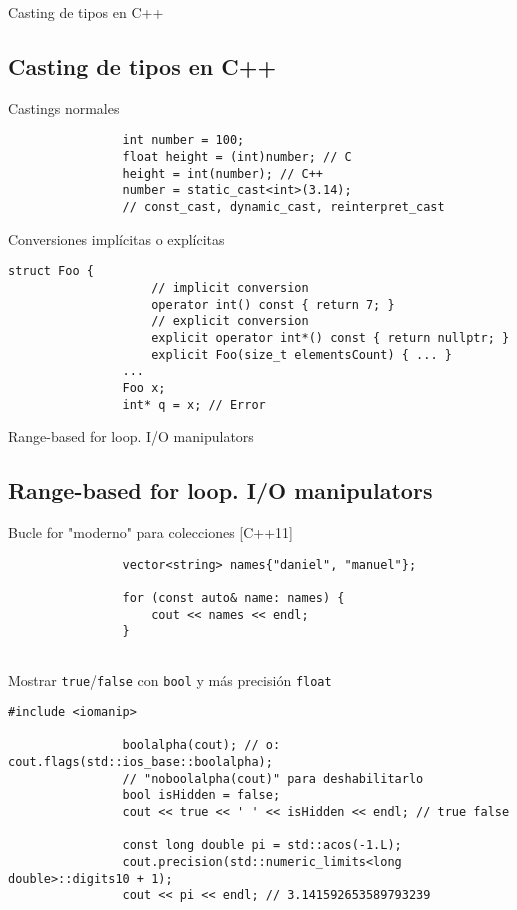 \documentclass{beamer}
\newcommand{\normalSizeItem}[1] {
  \normalsize{\item #1}
}
\begin{document}
		\begin{frame}[fragile]{Casting de tipos en C++}	
			\subsection{Casting de tipos en C++}		
			\begin{itemize}
			
				\normalSizeItem { Castings normales }
				\begin{lstlisting}
				int number = 100;
				float height = (int)number; // C
				height = int(number); // C++
				number = static_cast<int>(3.14);
				// const_cast, dynamic_cast, reinterpret_cast
				\end{lstlisting}
				
				\normalSizeItem { Conversiones implícitas o explícitas }
				\begin{lstlisting}[basicstyle={\tiny\ttfamily}]
				struct Foo {
					// implicit conversion
					operator int() const { return 7; } 
					// explicit conversion
					explicit operator int*() const { return nullptr; }   
					explicit Foo(size_t elementsCount) { ... }
				...
				Foo x;
				int* q = x; // Error
				\end{lstlisting}
				
			\end{itemize}
		\end{frame}
		
		\begin{frame}[fragile]{Range-based for loop. I/O manipulators}	
			\subsection{Range-based for loop. I/O manipulators}		
			\begin{itemize}
			
				\normalSizeItem { Bucle for "moderno" para colecciones [C++11] }
				\begin{lstlisting}
				vector<string> names{"daniel", "manuel"};
				
				for (const auto& name: names) {
					cout << names << endl;
				}
				
				\end{lstlisting}
				
				\normalSizeItem { Mostrar \texttt{true}/\texttt{false} con \texttt{bool} y más precisión \texttt{float} }
				\begin{lstlisting}[basicstyle={\tiny\ttfamily}]
				#include <iomanip>
				
				boolalpha(cout); // o: cout.flags(std::ios_base::boolalpha);
				// "noboolalpha(cout)" para deshabilitarlo
				bool isHidden = false;
				cout << true << ' ' << isHidden << endl; // true false
				
				const long double pi = std::acos(-1.L);
				cout.precision(std::numeric_limits<long double>::digits10 + 1);
				cout << pi << endl; // 3.141592653589793239
				\end{lstlisting}
				
			\end{itemize}
		\end{frame}
		
\end{document}
